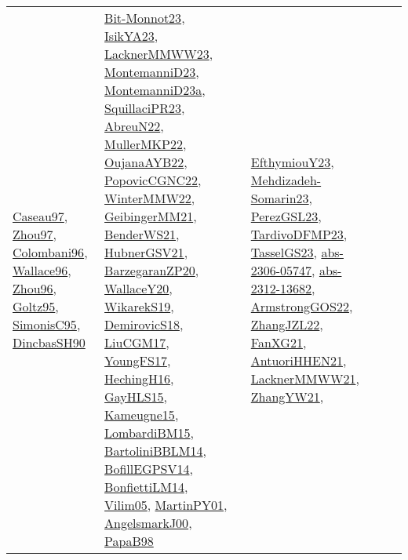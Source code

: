 {\begin{longtable}{lp{3cm}>{\raggedright}p{6cm}>{\raggedright}p{6cm}p{8cm}}
\href{papers/Caseau97.pdf}{Caseau97}\cite{Caseau97}, \href{articles/Zhou97.pdf}{Zhou97}\cite{Zhou97}, \href{papers/Colombani96.pdf}{Colombani96}\cite{Colombani96}, \href{articles/Wallace96.pdf}{Wallace96}\cite{Wallace96}, \href{papers/Zhou96.pdf}{Zhou96}\cite{Zhou96}, \href{papers/Goltz95.pdf}{Goltz95}\cite{Goltz95}, \href{papers/SimonisC95.pdf}{SimonisC95}\cite{SimonisC95}, \href{articles/DincbasSH90.pdf}{DincbasSH90}\cite{DincbasSH90} & \href{papers/Bit-Monnot23.pdf}{Bit-Monnot23}\cite{Bit-Monnot23}, \href{articles/IsikYA23.pdf}{IsikYA23}\cite{IsikYA23}, \href{articles/LacknerMMWW23.pdf}{LacknerMMWW23}\cite{LacknerMMWW23}, \href{articles/MontemanniD23.pdf}{MontemanniD23}\cite{MontemanniD23}, \href{articles/MontemanniD23a.pdf}{MontemanniD23a}\cite{MontemanniD23a}, \href{papers/SquillaciPR23.pdf}{SquillaciPR23}\cite{SquillaciPR23}, \href{articles/AbreuN22.pdf}{AbreuN22}\cite{AbreuN22}, \href{articles/MullerMKP22.pdf}{MullerMKP22}\cite{MullerMKP22}, \href{papers/OujanaAYB22.pdf}{OujanaAYB22}\cite{OujanaAYB22}, \href{papers/PopovicCGNC22.pdf}{PopovicCGNC22}\cite{PopovicCGNC22}, \href{papers/WinterMMW22.pdf}{WinterMMW22}\cite{WinterMMW22}, \href{papers/GeibingerMM21.pdf}{GeibingerMM21}\cite{GeibingerMM21}, \href{papers/BenderWS21.pdf}{BenderWS21}\cite{BenderWS21}, \href{articles/HubnerGSV21.pdf}{HubnerGSV21}\cite{HubnerGSV21}, \href{papers/BarzegaranZP20.pdf}{BarzegaranZP20}\cite{BarzegaranZP20}, \href{articles/WallaceY20.pdf}{WallaceY20}\cite{WallaceY20}, \href{articles/WikarekS19.pdf}{WikarekS19}\cite{WikarekS19}, \href{papers/DemirovicS18.pdf}{DemirovicS18}\cite{DemirovicS18}, \href{papers/LiuCGM17.pdf}{LiuCGM17}\cite{LiuCGM17}, \href{papers/YoungFS17.pdf}{YoungFS17}\cite{YoungFS17}, \href{papers/HechingH16.pdf}{HechingH16}\cite{HechingH16}, \href{papers/GayHLS15.pdf}{GayHLS15}\cite{GayHLS15}, \href{articles/Kameugne15.pdf}{Kameugne15}\cite{Kameugne15}, \href{papers/LombardiBM15.pdf}{LombardiBM15}\cite{LombardiBM15}, \href{papers/BartoliniBBLM14.pdf}{BartoliniBBLM14}\cite{BartoliniBBLM14}, \href{papers/BofillEGPSV14.pdf}{BofillEGPSV14}\cite{BofillEGPSV14}, \href{papers/BonfiettiLM14.pdf}{BonfiettiLM14}\cite{BonfiettiLM14}, \href{papers/Vilim05.pdf}{Vilim05}\cite{Vilim05}, \href{articles/MartinPY01.pdf}{MartinPY01}\cite{MartinPY01}, \href{papers/AngelsmarkJ00.pdf}{AngelsmarkJ00}\cite{AngelsmarkJ00}, \href{articles/PapaB98.pdf}{PapaB98}\cite{PapaB98} & \href{papers/EfthymiouY23.pdf}{EfthymiouY23}\cite{EfthymiouY23}, \href{papers/Mehdizadeh-Somarin23.pdf}{Mehdizadeh-Somarin23}\cite{Mehdizadeh-Somarin23}, \href{papers/PerezGSL23.pdf}{PerezGSL23}\cite{PerezGSL23}, \href{papers/TardivoDFMP23.pdf}{TardivoDFMP23}\cite{TardivoDFMP23}, \href{papers/TasselGS23.pdf}{TasselGS23}\cite{TasselGS23}, \href{articles/abs-2306-05747.pdf}{abs-2306-05747}\cite{abs-2306-05747}, \href{articles/abs-2312-13682.pdf}{abs-2312-13682}\cite{abs-2312-13682}, \href{papers/ArmstrongGOS22.pdf}{ArmstrongGOS22}\cite{ArmstrongGOS22}, \href{papers/ZhangJZL22.pdf}{ZhangJZL22}\cite{ZhangJZL22}, \href{articles/FanXG21.pdf}{FanXG21}\cite{FanXG21}, \href{papers/AntuoriHHEN21.pdf}{AntuoriHHEN21}\cite{AntuoriHHEN21}, \href{papers/LacknerMMWW21.pdf}{LacknerMMWW21}\cite{LacknerMMWW21}, \href{articles/ZhangYW21.pdf}{ZhangYW21}\cite{ZhangYW21}, 
\end{longtable}}
